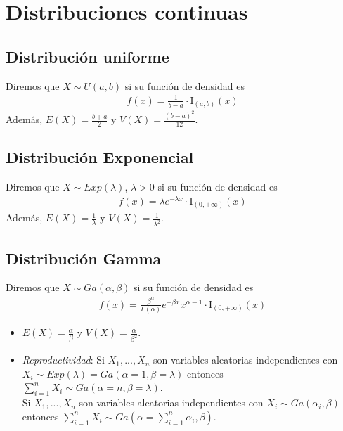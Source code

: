 \section{Distribuciones continuas}

\subsection{Distribución uniforme}
Diremos que $X \sim U(a,b)$ si su función de densidad es
\begin{align*}
    f(x) = \frac{1}{b-a} \cdot \text{I}_{(a,b)}(x)
\end{align*}
Además, $E(X) = \frac{b+a}{2}$ y $V(X) = \frac{(b-a)^2}{12}$.

\subsection{Distribución Exponencial}
Diremos que $X \sim Exp(\lambda)$, $\lambda > 0$ si su función de densidad es
\begin{align*}
    f(x) = \lambda e^{-\lambda x} \cdot \text{I}_{(0,+\infty)}(x)
\end{align*}
Además, $E(X) = \frac{1}{\lambda}$ y $V(X) = \frac{1}{\lambda^2}$.

\subsection{Distribución Gamma}

Diremos que $X \sim Ga(\alpha, \beta)$ si su función de densidad es
\begin{align*}
    f(x) = \frac{\beta^{\alpha}}{\Gamma(\alpha)}e^{-\beta x}x^{\alpha - 1} \cdot \text{I}_{(0,+\infty)}(x)
\end{align*}

\begin{itemize}
    \item $E(X) = \frac{\alpha}{\beta}$ y $V(X) = \frac{\alpha}{\beta^2}$.
    \item \textit{Reproductividad}: Si $X_1,...,X_n$ son variables aleatorias independientes con $X_i \sim Exp(\lambda) = Ga(\alpha = 1, \beta = \lambda)$ entonces $\sum_{i=1}^{n}{X_i} \sim Ga(\alpha = n, \beta = \lambda)$.
    \\
    \newline
    Si $X_1,...,X_n$ son variables aleatorias independientes con $X_i \sim Ga(\alpha_i, \beta)$ entonces $\sum_{i=1}^{n}{X_i} \sim Ga\left(\alpha = \sum_{i=1}^{n}{\alpha_i}, \beta \right)$.
\end{itemize}

